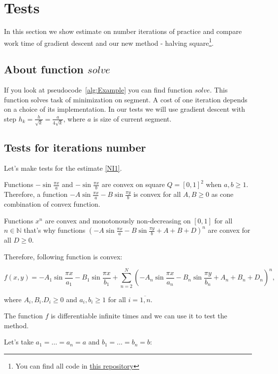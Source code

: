 \documentclass[12pt]{article}
\begin{document}
\section{Tests}

In this section we show estimate on number iterations of practice and compare work time of gradient descent and our new method - halving square\footnote{You can find all code in \href{https://github.com/ASEDOS999/Optimization-Halving-The-Square/tree/master/Tests}{this repository}}.

\subsection{About function $solve$}

If you look at pseudocode~\ref{alg:Example} you can find function $solve$. This function solves task of minimization on segment. A cost of one iteration depends on a choice of its implementation. In our tests we will use gradient descent with step $h_k = \frac{h}{\sqrt{k}} = \frac{a}{4\sqrt{k}}$, where $a$ is size of current segment.

\subsection{Tests for iterations number}

Let's make tests for the estimate \eqref{NI1}.

Functions $-\sin\frac{\pi x}{a}$ and $-\sin\frac{\pi x}{b}$ are convex on square $Q = [0,1]^2$ when $a,b\geq 1$. Therefore, a function $-A\sin\frac{\pi x}{a} - B\sin\frac{\pi y}{b}$ is convex for all $A,B\geq 0$ as cone combination of convex function.

Functions $x^n$ are convex and monotonously non-decreasing on $[0, 1]$ for all $n \in \mathbb{N}$ that's why functions $\left(-A\sin\frac{\pi x}{a} - B\sin\frac{\pi y}{b} + A + B + D\right)^n$ are convex for all $D\geq 0$.

Therefore, following function is convex:

$$f(x,y) = -A_1\sin\frac{\pi x}{a_1} - B_1\sin\frac{\pi x}{b_1} + \sum\limits_{n=2}^N\left(-A_n\sin\frac{\pi x}{a_n} - B_n\sin\frac{\pi y}{b_n} + A_n + B_n + D_n\right)^n,$$

where $A_i, B_i. D_i\geq 0$ and $a_i, b_i \geq 1$ for all $i = \overline{1, n}$.

The function $f$ is differentiable infinite times and we can use it to test the method.

Let's take $a_1 = \dots = a_n = a$ and $b_1 = \dots = b_n = b$:
\end{document}
